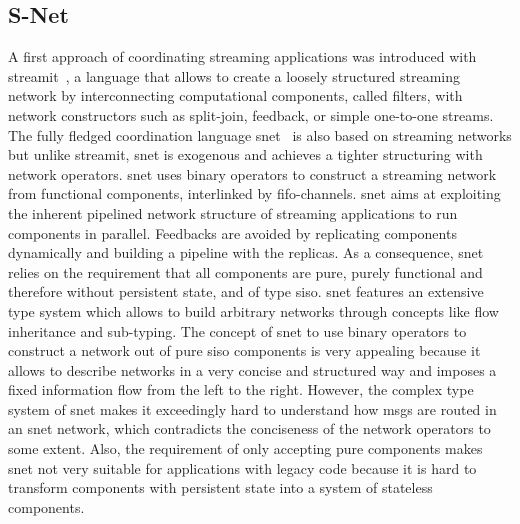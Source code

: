 \subsection{S-Net}
\label{sect_related_coord_snet}
A first approach of coordinating streaming applications was introduced with \gls*{streamit}~\cite{thies2002}, a language that allows to create a loosely structured streaming network by interconnecting computational components, called filters, with network constructors such as split-join, feedback, or simple one-to-one streams.
The fully fledged coordination language \gls*{snet}~\cite{grelck2010} is also based on streaming networks but unlike \gls*{streamit}, \gls*{snet} is exogenous and achieves a tighter structuring with network operators.
\Gls*{snet} uses binary operators to construct a streaming network from functional components, interlinked by \gls{fifo}-channels.
\Gls*{snet} aims at exploiting the inherent pipelined network structure of streaming applications to run components in parallel.
Feedbacks are avoided by replicating components dynamically and building a pipeline with the replicas.
As a consequence, \gls*{snet} relies on the requirement that all components are pure, \ie purely functional and therefore without persistent state, and of type \gls{siso}.
\Gls*{snet} features an extensive type system which allows to build arbitrary networks through concepts like flow inheritance and sub-typing.
The concept of \gls*{snet} to use binary operators to construct a network out of pure \gls{siso} components is very appealing because it allows to describe networks in a very concise and structured way and imposes a fixed information flow from the left to the right.
However, the complex type system of \gls*{snet} makes it exceedingly hard to understand how \glspl*{msg} are routed in an \gls*{snet} network, which contradicts the conciseness of the network operators to some extent.
Also, the requirement of only accepting pure components makes \gls*{snet} not very suitable for applications with legacy code because it is hard to transform components with persistent state into a system of stateless components.

